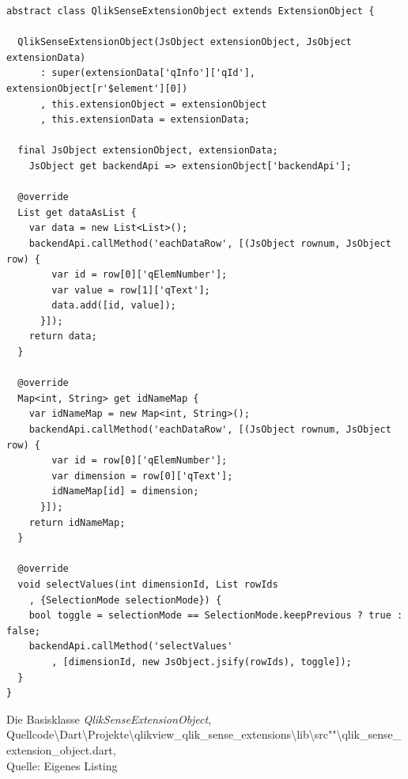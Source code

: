 \begin{listing}[htbp]
\begin{verbatim}
abstract class QlikSenseExtensionObject extends ExtensionObject {

  QlikSenseExtensionObject(JsObject extensionObject, JsObject extensionData)
      : super(extensionData['qInfo']['qId'], extensionObject[r'$element'][0])
      , this.extensionObject = extensionObject
      , this.extensionData = extensionData;
			
  final JsObject extensionObject, extensionData;
	JsObject get backendApi => extensionObject['backendApi'];
  
  @override
  List get dataAsList {
    var data = new List<List>();
    backendApi.callMethod('eachDataRow', [(JsObject rownum, JsObject row) {
        var id = row[0]['qElemNumber'];
        var value = row[1]['qText'];
        data.add([id, value]);
      }]);
    return data;
  }

  @override
  Map<int, String> get idNameMap {
    var idNameMap = new Map<int, String>();
    backendApi.callMethod('eachDataRow', [(JsObject rownum, JsObject row) {
        var id = row[0]['qElemNumber'];
        var dimension = row[0]['qText'];
        idNameMap[id] = dimension;
      }]);
    return idNameMap;
  }

  @override
  void selectValues(int dimensionId, List rowIds
    , {SelectionMode selectionMode}) {
    bool toggle = selectionMode == SelectionMode.keepPrevious ? true : false;
    backendApi.callMethod('selectValues'
        , [dimensionId, new JsObject.jsify(rowIds), toggle]);
  }
}
\end{verbatim}
\caption[Die Basisklasse \textit{QlikSenseExtensionObject}]{Die Basisklasse \textit{QlikSenseExtensionObject}, \\Quellcode\textbackslash{}Dart\textbackslash{}Projekte\textbackslash{}qlikview\_qlik\_sense\_extensions\textbackslash{}lib\textbackslash{}src""\textbackslash{}qlik\_sense\_extension\_object.dart, \\Quelle: Eigenes Listing}
\label{lst:QlikSenseExtensionObject}
\end{listing}

